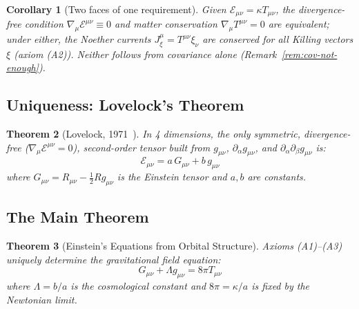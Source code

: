 \documentclass[11pt,twocolumn]{article}
\theoremstyle{plain}\newtheorem{theorem}{Theorem}\newtheorem{proposition}[theorem]{Proposition}\newtheorem{corollary}[theorem]{Corollary}\newtheorem{lemma}[theorem]{Lemma}
\theoremstyle{definition}\newtheorem{definition}[theorem]{Definition}
\theoremstyle{remark}\newtheorem{remark}[theorem]{Remark}
\begin{document}
\begin{corollary}[Two faces of one requirement]\label{cor:conservation}
Given $\mathcal{E}_{\mu\nu} = \kappa T_{\mu\nu}$, the divergence-free condition $\nabla_\mu\mathcal{E}^{\mu\nu} \equiv 0$ and matter conservation $\nabla_\mu T^{\mu\nu} = 0$ are equivalent; under either, the Noether currents $J^\mu_\xi = T^{\mu\nu}\xi_\nu$ are conserved for all Killing vectors $\xi$ (axiom (A2)). Neither follows from covariance alone (Remark~\ref{rem:cov-not-enough}).
\end{corollary}


\subsection{Uniqueness: Lovelock's Theorem}

\begin{theorem}[Lovelock, 1971~\cite{lovelock1971}]\label{thm:lovelock}
In 4 dimensions, the only symmetric, divergence-free ($\nabla_\mu\mathcal{E}^{\mu\nu} = 0$), second-order tensor built from $g_{\mu\nu}$, $\partial_\alpha g_{\mu\nu}$, and $\partial_\alpha\partial_\beta g_{\mu\nu}$ is:
\begin{equation}
\mathcal{E}_{\mu\nu} = a\, G_{\mu\nu} + b\, g_{\mu\nu}
\end{equation}
where $G_{\mu\nu} = R_{\mu\nu} - \frac{1}{2}Rg_{\mu\nu}$ is the Einstein tensor and $a, b$ are constants.
\end{theorem}


\subsection{The Main Theorem}

\begin{theorem}[Einstein's Equations from Orbital Structure]\label{thm:GR}
Axioms (A1)--(A3) uniquely determine the gravitational field equation:
\begin{equation}
\boxed{G_{\mu\nu} + \Lambda g_{\mu\nu} = 8\pi T_{\mu\nu}}
\end{equation}
where $\Lambda = b/a$ is the cosmological constant and $8\pi = \kappa/a$ is fixed by the Newtonian limit.
\end{theorem}
\end{document}
